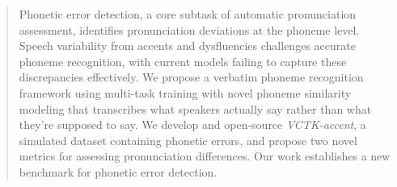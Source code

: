 \begin{abstract}
Phonetic error detection, a core subtask of automatic pronunciation assessment, identifies pronunciation deviations at the phoneme level. Speech variability from accents and dysfluencies challenges accurate phoneme recognition, with current models failing to capture these discrepancies effectively. We propose a verbatim phoneme recognition framework using multi-task training with novel phoneme similarity modeling that transcribes what speakers actually say rather than what they're supposed to say. We develop and open-source \textit{VCTK-accent}, a simulated dataset containing phonetic errors, and propose two novel metrics for assessing pronunciation differences. Our work establishes a new benchmark for phonetic error detection.

\end{abstract}